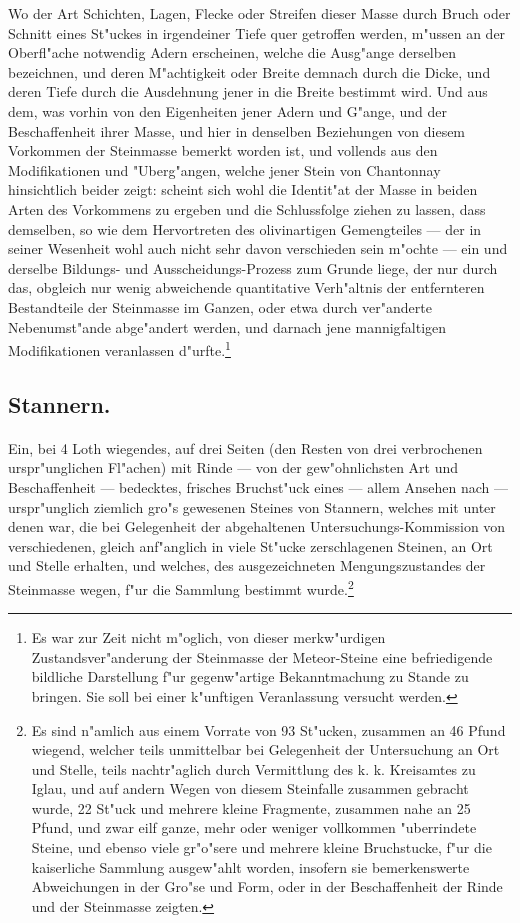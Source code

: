 \documentclass[a4paper, 11pt, oneside, german]{article}
\begin{document}
Wo der Art Schichten, Lagen, Flecke oder Streifen dieser Masse durch Bruch oder Schnitt eines St"uckes in irgendeiner Tiefe quer getroffen werden, m"ussen an der Oberfl"ache notwendig Adern erscheinen, welche die Ausg"ange derselben bezeichnen, und deren M"achtigkeit oder Breite demnach durch die Dicke, und deren Tiefe durch die Ausdehnung jener in die Breite bestimmt wird. Und aus dem, was vorhin von den Eigenheiten jener Adern und G"ange, und der Beschaffenheit ihrer Masse, und hier in denselben Beziehungen von diesem Vorkommen der Steinmasse bemerkt worden ist, und vollends aus den Modifikationen und "Uberg"angen, welche jener Stein von Chantonnay hinsichtlich beider zeigt: scheint sich wohl die Identit"at der Masse in beiden Arten des Vorkommens zu ergeben und die Schlussfolge ziehen zu lassen, dass demselben, so wie dem Hervortreten des olivinartigen Gemengteiles --- der in seiner Wesenheit wohl auch nicht sehr davon verschieden sein m"ochte --- ein und derselbe Bildungs- und Ausscheidungs-Prozess zum Grunde liege, der nur durch das, obgleich nur wenig abweichende quantitative Verh"altnis der entfernteren Bestandteile der Steinmasse im Ganzen, oder etwa durch ver"anderte Nebenumst"ande abge"andert werden, und darnach jene mannigfaltigen Modifikationen veranlassen d"urfte.\footnote{Es war zur Zeit nicht m"oglich, von dieser merkw"urdigen Zustandsver"anderung der Steinmasse der Meteor-Steine eine befriedigende bildliche Darstellung f"ur gegenw"artige Bekanntmachung zu Stande zu bringen. Sie soll bei einer k"unftigen Veranlassung versucht werden.}

\subsection{Stannern.}
\paragraph{}
Ein, bei 4 Loth wiegendes, auf drei Seiten (den Resten von drei verbrochenen urspr"unglichen Fl"achen) mit Rinde --- von der gew"ohnlichsten Art und Beschaffenheit --- bedecktes, frisches Bruchst"uck eines --- allem Ansehen nach --- urspr"unglich ziemlich gro"s gewesenen Steines von Stannern, welches mit unter denen war, die bei Gelegenheit der abgehaltenen Untersuchungs-Kommission von verschiedenen, gleich anf"anglich in viele St"ucke zerschlagenen Steinen, an Ort und Stelle erhalten, und welches, des ausgezeichneten Mengungszustandes der Steinmasse wegen, f"ur die Sammlung bestimmt wurde.\footnote{Es sind n"amlich aus einem Vorrate von 93 St"ucken, zusammen an 46 Pfund wiegend, welcher teils unmittelbar bei Gelegenheit der Untersuchung an Ort und Stelle, teils nachtr"aglich durch Vermittlung des k. k. Kreisamtes zu Iglau, und auf andern Wegen von diesem Steinfalle zusammen gebracht wurde, 22 St"uck und mehrere kleine Fragmente, zusammen nahe an 25 Pfund, und zwar eilf ganze, mehr oder weniger vollkommen "uberrindete Steine, und ebenso viele gr"o"sere und mehrere kleine Bruchstucke, f"ur die kaiserliche Sammlung ausgew"ahlt worden, insofern sie bemerkenswerte Abweichungen in der Gro"se und Form, oder in der Beschaffenheit der Rinde und der Steinmasse zeigten.}
\end{document}

